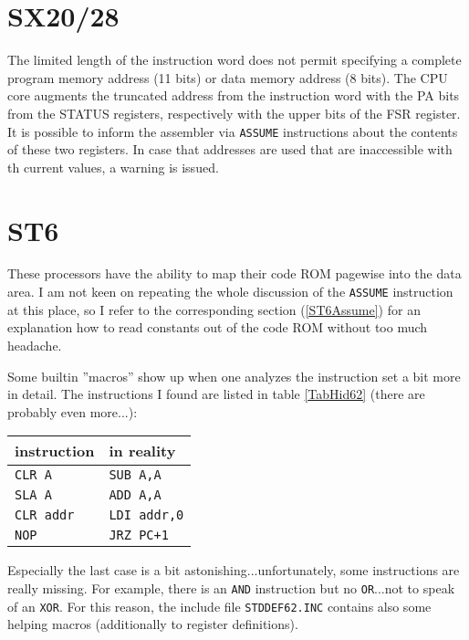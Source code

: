 \documentclass[12pt,twoside]{report}
\newcommand{\tty}[1]{{\tt #1}}
\begin{document}

\section{SX20/28}

The limited length of the instruction word does not permit specifying
a complete program memory address (11 bits) or data memory address (8
bits).  The CPU core augments the truncated address from the
instruction word with the PA bits from the STATUS registers,
respectively with the upper bits of the FSR register.  It is possible
to inform the assembler via \tty{ASSUME} instructions about the
contents of these two registers.  In case that addresses are used
that are inaccessible with th current values, a warning is issued.


\section{ST6}

These processors have the ability to map their code ROM pagewise into the
data area.  I am not keen on repeating the whole discussion of the
\tty{ASSUME} instruction at this place, so I refer to the corresponding
section (\ref{ST6Assume}) for an explanation how to read constants out of
the code ROM without too much headache.

Some builtin ''macros'' show up when one analyzes the instruction set a
bit more in detail.  The instructions I found are listed in table
\ref{TabHid62} (there are probably even more...):
\par
\begin{table*}[htbp]
\begin{center}\begin{tabular}{|l|l|}
\hline
instruction & in reality \\
\hline
\hline
\tty{CLR A}      & \tty{SUB A,A} \\
\tty{SLA A}      & \tty{ADD A,A} \\
\tty{CLR addr}   & \tty{LDI addr,0} \\
\tty{NOP}        & \tty{JRZ PC+1} \\
\hline
\end{tabular}\end{center}
\caption{Hidden Macros in the ST62's Instruction Set\label{TabHid62}}
\end{table*}
Especially the last case is a bit astonishing...unfortunately, some
instructions are really missing.  For example, there is an \tty{AND}
instruction but no \tty{OR}...not to speak of an \tty{XOR}.  For this reason, the
include file \tty{STDDEF62.INC} contains also some helping macros
(additionally to register definitions).
\end{document}
